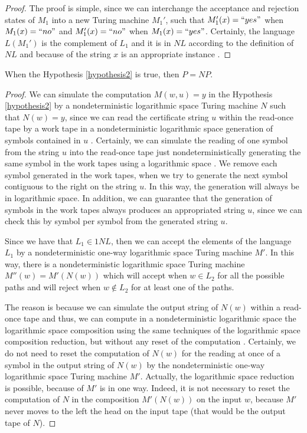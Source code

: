 \documentclass[a4paper,UKenglish,cleveref, autoref]{lipics-v2019}
\begin{document}
\begin{proof}
The proof is simple, since we can interchange the acceptance and rejection states of $M_{1}$ into a new Turing machine $M_{1}'$, such that $M_{1}'(x) = ``yes"$ when $M_{1}(x) = ``no"$ and $M_{1}'(x) = ``no"$ when $M_{1}(x) = ``yes"$. Certainly, the language $L(M_{1}')$ is the complement of $L_{1}$ and it is in $NL$ according to the definition of $NL$ and because of the string $x$ is an appropriate instance \cite{Pap03}.
\end{proof}

\begin{theorem}
\label{pos-implication}
When the Hypothesis \ref{hypothesis2} is true, then $P = NP$.
\end{theorem}

\begin{proof}
We can simulate the computation $M(w, u) = y$ in the Hypothesis \ref{hypothesis2} by a nondeterministic logarithmic space Turing machine $N$ such that $N(w) = y$, since we can read the certificate string $u$ within the read-once tape by a work tape in a nondeterministic logarithmic space generation of symbols contained in $u$ \cite{Pap03}. Certainly, we can simulate the reading of one symbol from the string $u$ into the read-once tape just nondeterministically generating the same symbol in the work tapes using a logarithmic space \cite{Pap03}. We remove each symbol generated in the work tapes, when we try to generate the next symbol contiguous to the right on the string $u$. In this way, the generation will always be in logarithmic space. In addition, we can guarantee that the generation of symbols in the work tapes always produces an appropriated string $u$, since we can check this by symbol per symbol from the generated string $u$.

Since we have that $L_{1} \in 1NL$, then we can accept the elements of the language $L_{1}$ by a nondeterministic one-way logarithmic space Turing machine $M'$. In this way, there is a nondeterministic logarithmic space Turing machine $M''(w) = M'(N(w))$ which will accept when $w \in L_{2}$ for all the possible paths and will reject when $w \notin L_{2}$ for at least one of the paths. 

The reason is because we can simulate the output string of $N(w)$ within a read-once tape and thus, we can compute in a nondeterministic logarithmic space the logarithmic space composition using the same techniques of the logarithmic space composition reduction, but without any reset of the computation \cite{Pap03}. Certainly, we do not need to reset the computation of $N(w)$ for the reading at once of a symbol in the output string of $N(w)$ by the nondeterministic one-way logarithmic space Turing machine $M'$. Actually, the logarithmic space reduction is possible, because of $M'$ is in one way. Indeed, it is not necessary to reset the computation of $N$ in the composition $M'(N(w))$ on the input $w$, because $M'$ never moves to the left the head on the input tape (that would be the output tape of $N$).


\end{proof}
\end{document}
